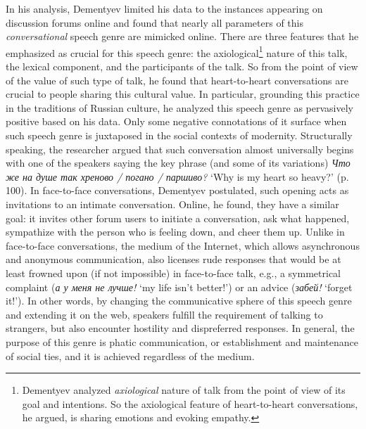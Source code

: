 \documentclass[12pt]{article}
\begin{document}
In his analysis, Dementyev limited his data to the instances appearing  on discussion forums online and found that nearly all parameters of this \textit{conversational} speech genre are mimicked online. There are three features that he emphasized as crucial for this speech genre: the axiological\footnote{Dementyev analyzed \textit{axiological} nature of talk from the point of view of its goal and intentions. So the axiological feature of heart-to-heart conversations, he argued, is sharing emotions and evoking empathy.} nature of this talk, the lexical component, and the participants of the talk. So from the point of view of the value of such type of talk, he found that heart-to-heart conversations are crucial to people sharing this cultural value. In particular, grounding this practice in the traditions of Russian culture, he analyzed this speech genre as pervasively positive based on his data. Only some negative connotations of it surface when such speech genre is juxtaposed in the social contexts of modernity. Structurally speaking, the researcher argued that such conversation almost universally begins with one of the speakers saying the key phrase (and some of its variations) \foreignlanguage{russian}{\textit{Что же на душе так хреново / погано / паршиво?}} `Why is my heart so heavy?' (p. 100). In face-to-face conversations, Dementyev postulated, such  opening acts as  invitations to an intimate conversation. Online, he found, they have a similar goal: it invites other forum users to initiate a conversation, ask what happened, sympathize with the person who is feeling down, and cheer them up. Unlike in face-to-face conversations, the medium of the Internet, which allows asynchronous and anonymous communication, also licenses rude responses that would be at least frowned upon (if not impossible) in face-to-face talk, e.g., a symmetrical complaint (\foreignlanguage{russian}{\textit{а у меня не лучше!} `my life isn't better!'}) or an advice (\foreignlanguage{russian}{\textit{забей!}} `forget it!'). In other words, by changing the communicative sphere of this speech genre and extending it on the web, speakers fulfill the requirement of talking to strangers, but also encounter hostility and dispreferred responses. In general, the purpose of this genre is phatic communication, or establishment and maintenance of social ties, and it is achieved regardless of the medium.
\end{document}
